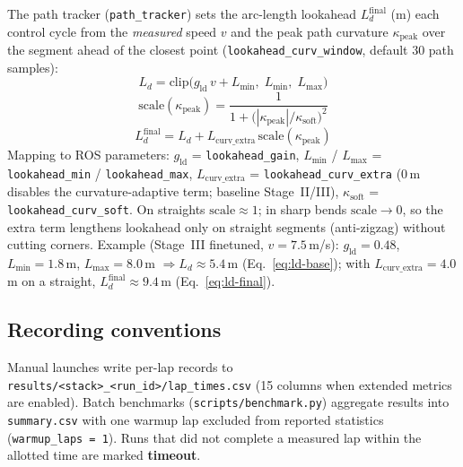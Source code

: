 \documentclass[11pt,a4paper]{article}
\begin{document}
The path tracker (\texttt{path\_tracker}) sets the arc-length lookahead
$L_d^{\mathrm{final}}$ (m) each control cycle from the \emph{measured} speed $v$
and the peak path curvature $\kappa_{\mathrm{peak}}$ over the segment ahead of the
closest point (\texttt{lookahead\_curv\_window}, default 30 path samples):
\begin{equation}
  \label{eq:ld-base}
  L_d = \mathrm{clip}\bigl(g_{\mathrm{ld}}\, v + L_{\min},\; L_{\min},\; L_{\max}\bigr)
\end{equation}
\begin{equation}
  \label{eq:ld-scale}
  \mathrm{scale}(\kappa_{\mathrm{peak}})
  = \frac{1}{1 + \bigl(|\kappa_{\mathrm{peak}}| / \kappa_{\mathrm{soft}}\bigr)^2}
\end{equation}
\begin{equation}
  \label{eq:ld-final}
  L_d^{\mathrm{final}}
  = L_d + L_{\mathrm{curv\_extra}}\,
    \mathrm{scale}(\kappa_{\mathrm{peak}})
\end{equation}
\noindent
Mapping to ROS parameters:
$g_{\mathrm{ld}}$ = \texttt{lookahead\_gain},
$L_{\min}$ / $L_{\max}$ = \texttt{lookahead\_min} / \texttt{lookahead\_max},
$L_{\mathrm{curv\_extra}}$ = \texttt{lookahead\_curv\_extra}
(0\,m disables the curvature-adaptive term; baseline Stage~II/III),
$\kappa_{\mathrm{soft}}$ = \texttt{lookahead\_curv\_soft}.
On straights $\mathrm{scale} \approx 1$; in sharp bends $\mathrm{scale} \to 0$,
so the extra term lengthens lookahead only on straight segments (anti-zigzag)
without cutting corners.
Example (Stage~III finetuned, $v = 7.5$\,m/s):
$g_{\mathrm{ld}} = 0.48$, $L_{\min} = 1.8$\,m, $L_{\max} = 8.0$\,m
$\Rightarrow L_d \approx 5.4$\,m (Eq.~\ref{eq:ld-base});
with $L_{\mathrm{curv\_extra}} = 4.0$\,m on a straight,
$L_d^{\mathrm{final}} \approx 9.4$\,m (Eq.~\ref{eq:ld-final}).

\subsection{Recording conventions}
Manual launches write per-lap records to \texttt{results/<stack>\_<run\_id>/lap\_times.csv}
(15 columns when extended metrics are enabled).
Batch benchmarks (\texttt{scripts/benchmark.py}) aggregate results into
\texttt{summary.csv} with one warmup lap excluded from reported statistics
(\texttt{warmup\_laps = 1}).
Runs that did not complete a measured lap within the allotted time are marked
\textbf{timeout}.

\end{document}
